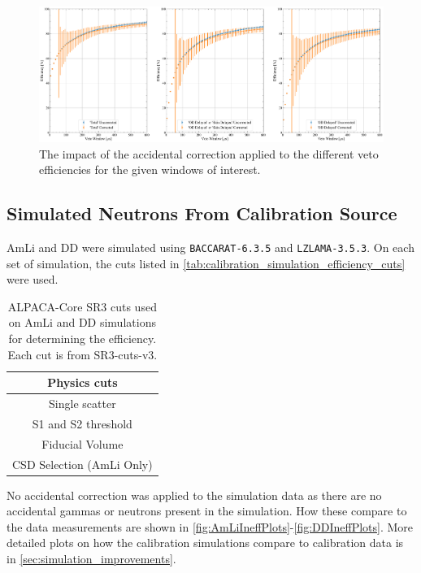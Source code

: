 \begin{figure}
    \centering
    \includegraphics[width=\textwidth]{figures/VetoEfficiency/DDAccCorrectionParameters.pdf}
    \caption{The impact of the accidental correction applied to the different veto efficiencies for the given windows of interest.}
    \label{fig:figures/VetoEfficiency/DDAccCorrectionParameters}
\end{figure}



\subsection{Simulated Neutrons From Calibration Source}
AmLi and DD were simulated using \lstinline{BACCARAT-6.3.5} and \lstinline{LZLAMA-3.5.3}.
On each set of simulation, the cuts listed in \autoref{tab:calibration_simulation_efficiency_cuts} were used.
\begin{table}
    \centering
    \begin{tabular}{c}
     Physics cuts  \\
     \hline
     Single scatter \\
     S1 and S2 threshold \\
     Fiducial Volume \\
     CSD Selection (AmLi Only)\\
    \end{tabular}
    \caption{ALPACA-Core SR3 cuts used on AmLi and DD simulations for determining the efficiency. Each cut is from SR3-cuts-v3.}
    \label{tab:calibration_simulation_efficiency_cuts}
\end{table}
No accidental correction was applied to the simulation data as there are no accidental gammas or neutrons present in the simulation.
How these compare to the data measurements are shown in \autoref{fig:AmLiIneffPlots}-\ref{fig:DDIneffPlots}.
More detailed plots on how the calibration simulations compare to calibration data is in \autoref{sec:simulation_improvements}.

